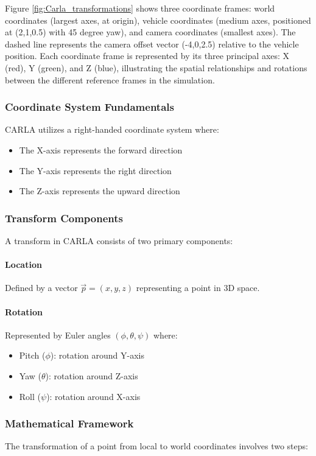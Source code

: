 Figure \ref{fig:Carla_transformations} shows three coordinate frames: world coordinates (largest axes, at origin), vehicle coordinates (medium axes, positioned at (2,1,0.5) with 45 degree yaw), and camera coordinates (smallest axes). The dashed line represents the camera offset vector (-4,0,2.5) relative to the vehicle position. Each coordinate frame is represented by its three principal axes: X (red), Y (green), and Z (blue), illustrating the spatial relationships and rotations between the different reference frames in the simulation.


\subsubsection{Coordinate System Fundamentals}
CARLA utilizes a right-handed coordinate system where:
\begin{itemize}
    \item The X-axis represents the forward direction
    \item The Y-axis represents the right direction
    \item The Z-axis represents the upward direction
\end{itemize}

\subsubsection{Transform Components}
A transform in CARLA consists of two primary components:

\paragraph{Location} Defined by a vector $\vec{p} = (x, y, z)$ representing a point in 3D space.

\paragraph{Rotation} Represented by Euler angles $(\phi, \theta, \psi)$ where:
\begin{itemize}
    \item Pitch ($\phi$): rotation around Y-axis
    \item Yaw ($\theta$): rotation around Z-axis
    \item Roll ($\psi$): rotation around X-axis
\end{itemize}

\subsubsection{Mathematical Framework}
The transformation of a point from local to world coordinates involves two steps:

